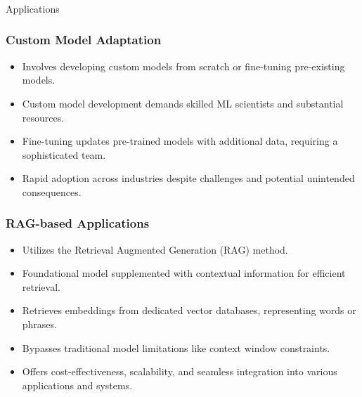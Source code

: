 \begin{frame}[fragile]\frametitle{}
\begin{center}
{\Large Applications}
\end{center}
\end{frame}

\begin{frame}[fragile]\frametitle{Custom Model Adaptation}
      \begin{itemize}
        \item Involves developing custom models from scratch or fine-tuning pre-existing models.
        \item Custom model development demands skilled ML scientists and substantial resources.
        \item Fine-tuning updates pre-trained models with additional data, requiring a sophisticated team.
        \item Rapid adoption across industries despite challenges and potential unintended consequences.
      \end{itemize}

\end{frame}

\begin{frame}[fragile]\frametitle{RAG-based Applications}

      \begin{itemize}
        \item Utilizes the Retrieval Augmented Generation (RAG) method.
        \item Foundational model supplemented with contextual information for efficient retrieval.
        \item Retrieves embeddings from dedicated vector databases, representing words or phrases.
        \item Bypasses traditional model limitations like context window constraints.
        \item Offers cost-effectiveness, scalability, and seamless integration into various applications and systems.
      \end{itemize}

\end{frame}

